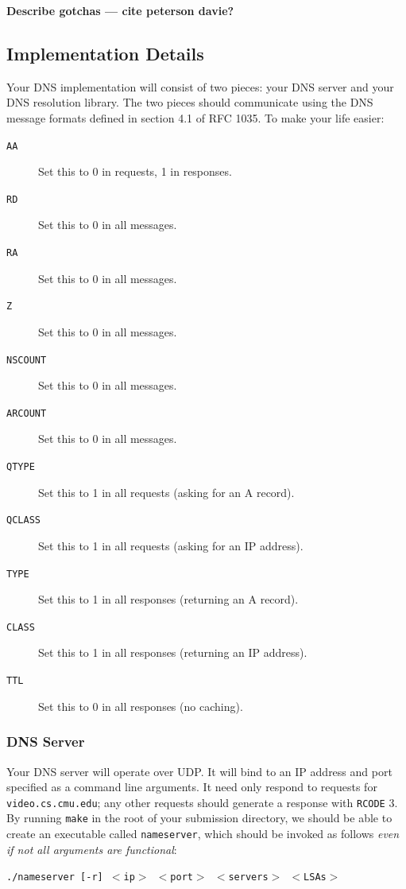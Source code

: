 \documentclass{article}
\newcommand{\theurl}{\texttt{video.cs.cmu.edu}}
\begin{document}
\textbf{Describe gotchas --- cite peterson
davie?} 


\subsection{Implementation Details}
\label{sec:dns-details}

Your DNS implementation will consist of two pieces: your DNS server and your
DNS resolution library. The two pieces should communicate using the DNS message
formats defined in section 4.1 of RFC 1035. To make your life easier:

\begin{description}
	\item[\texttt{AA}] Set this to 0 in requests, 1 in responses.
	\item[\texttt{RD}] Set this to 0 in all messages.
	\item[\texttt{RA}] Set this to 0 in all messages.
	\item[\texttt{Z}] Set this to 0 in all messages.
	\item[\texttt{NSCOUNT}] Set this to 0 in all messages.
	\item[\texttt{ARCOUNT}] Set this to 0 in all messages.
	\item[\texttt{QTYPE}] Set this to 1 in all requests (asking for an A record).
	\item[\texttt{QCLASS}] Set this to 1 in all requests (asking for an IP address).
	\item[\texttt{TYPE}] Set this to 1 in all responses (returning an A record).
	\item[\texttt{CLASS}] Set this to 1 in all responses (returning an IP address).
	\item[\texttt{TTL}] Set this to 0 in all responses (no caching).
\end{description}

\subsubsection{DNS Server}

Your DNS server will operate over UDP. It will bind to an IP address and port
specified as a command line arguments. It need only respond to requests for
\theurl; any other requests should generate a response with \texttt{RCODE} 3.
By running \texttt{make} in the root of your submission directory, we should be
able to create an executable called \texttt{nameserver}, which should be
invoked as follows \emph{even if not all arguments are functional}:
\begin{center}
	\texttt{./nameserver [-r] $<$ip$>$ $<$port$>$ $<$servers$>$ $<$LSAs$>$}
\end{center}
\end{document}
